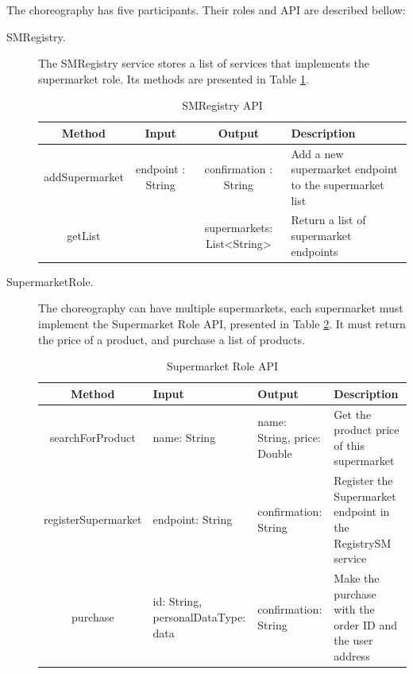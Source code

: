 The choreography has five participants. Their roles and API are described bellow:
\begin{description}
\item[SMRegistry.] The SMRegistry service stores a list of services that implements the supermarket role. Its methods are presented in Table \ref{smregistryapi}.
	\begin{table}[htdp]
	\caption{SMRegistry API}
	\begin{center}
	\begin{tabular}{|c|c|c|m{4cm}|}
		\hline
		Method & Input & Output & Description \\ \hline
		addSupermarket & endpoint : String & confirmation : String & Add a new supermarket endpoint to the supermarket list \\ \hline
		getList & & supermarkets: List<String> & Return a list of supermarket endpoints \\ \hline
	\end{tabular}
	\end{center}
	\label{smregistryapi}
	\end{table}%

\item[SupermarketRole.] The choreography can have multiple supermarkets, each supermarket must implement the Supermarket Role API, presented in Table \ref{smroleapi}. It must return the price of a product, and purchase a list of products.
	\begin{table}[htdp]
	\caption{Supermarket Role API}
	\begin{center}
	\begin{tabular}{|c|m{3.5cm}|m{3.5cm}|m{4cm}|}
		\hline
		Method				& Input						& Output 					& Description \\ \hline
		searchForProduct 		& name: String					& name: String, price: Double 	& Get the product price of this supermarket \\ \hline
		registerSupermarket		& endpoint: String				& confirmation: String		& Register the Supermarket endpoint in the RegistrySM service \\ \hline
		purchase				& id: String, personalDataType: data & confirmation: String		& Make the purchase with the order ID and the user address \\ \hline
	\end{tabular}
	\end{center}
	\label{smroleapi}
	\end{table}%
	

\end{description}
